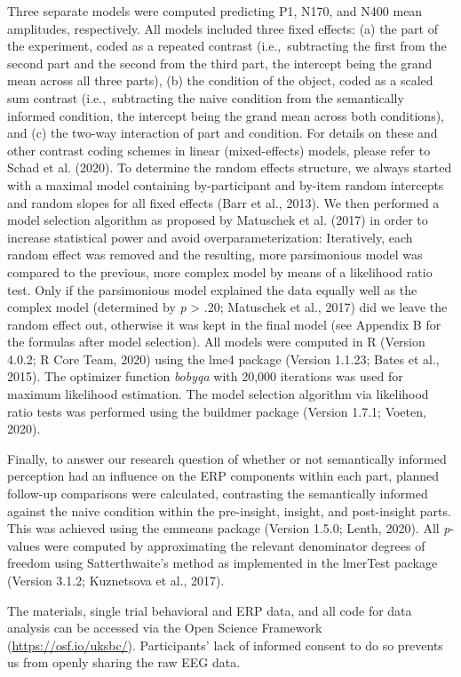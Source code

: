 \documentclass[
  english,
  man,floatsintext]{apa7}
\begin{document}
Three separate models were computed predicting P1, N170, and N400 mean amplitudes, respectively. All models included three fixed effects: (a) the part of the experiment, coded as a repeated contrast (i.e.,~subtracting the first from the second part and the second from the third part, the intercept being the grand mean across all three parts), (b) the condition of the object, coded as a scaled sum contrast (i.e.,~subtracting the naive condition from the semantically informed condition, the intercept being the grand mean across both conditions), and (c) the two-way interaction of part and condition. For details on these and other contrast coding schemes in linear (mixed-effects) models, please refer to Schad et al. (2020). To determine the random effects structure, we always started with a maximal model containing by-participant and by-item random intercepts and random slopes for all fixed effects (Barr et al., 2013). We then performed a model selection algorithm as proposed by Matuschek et al. (2017) in order to increase statistical power and avoid overparameterization: Iteratively, each random effect was removed and the resulting, more parsimonious model was compared to the previous, more complex model by means of a likelihood ratio test. Only if the parsimonious model explained the data equally well as the complex model (determined by \emph{p} \textgreater{} .20; Matuschek et al., 2017) did we leave the random effect out, otherwise it was kept in the final model (see Appendix B for the formulas after model selection). All models were computed in R (Version 4.0.2; R Core Team, 2020) using the lme4 package (Version 1.1.23; Bates et al., 2015). The optimizer function \emph{bobyqa} with 20,000 iterations was used for maximum likelihood estimation. The model selection algorithm via likelihood ratio tests was performed using the buildmer package (Version 1.7.1; Voeten, 2020).

Finally, to answer our research question of whether or not semantically informed perception had an influence on the ERP components within each part, planned follow-up comparisons were calculated, contrasting the semantically informed against the naive condition within the pre-insight, \mbox{insight}, and post-insight parts. This was achieved using the emmeans package (Version 1.5.0; Lenth, 2020). All \emph{p}-values were computed by approximating the relevant denominator degrees of freedom using Satterthwaite's method as implemented in the lmerTest package (Version 3.1.2; Kuznetsova et al., 2017).

The materials, single trial behavioral and ERP data, and all code for data analysis can be accessed via the Open Science Framework (\url{https://osf.io/uksbc/}). Participants' lack of informed consent to do so prevents us from openly sharing the raw EEG data.
\end{document}
